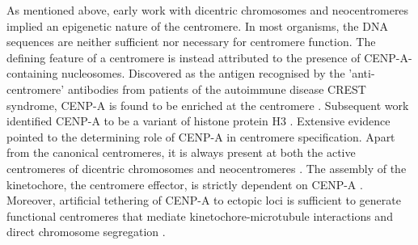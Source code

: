 As mentioned above, early work with dicentric chromosomes and neocentromeres implied an epigenetic nature of the centromere. In most organisms, the DNA sequences are neither sufficient nor necessary for centromere function. The defining feature of a centromere is instead attributed to the presence of CENP-A-containing nucleosomes. Discovered as the antigen recognised by the 'anti-centromere' antibodies from patients of the autoimmune disease CREST syndrome, CENP-A is found to be enriched at the centromere \citep{Earnshaw1985IdentificationScleroderma}. Subsequent work identified CENP-A to be a variant of histone protein H3 \citep{Palmer1987AHistones, Palmer1990TheNuclei, Palmer1991PurificationHistone., Palmer1985KinetochoreMononucleosomes, Sullivan1994HumanCentromere., Buchwitz1999AElegans, Henikoff2014TheVivo, Takahashi2000RequirementYeast}. Extensive evidence pointed to the determining role of CENP-A in centromere specification. Apart from the canonical centromeres, it is always present at both the active centromeres of dicentric chromosomes \citep{Earnshaw1985ThreeChromosome} and neocentromeres \citep{Marshall2008Neocentromeres:Evolution}. The assembly of the kinetochore, the centromere effector, is strictly dependent on CENP-A \citep{Fachinetti2013, Liu2006MappingCells, Regnier2005CENP-ABubR1}. Moreover, artificial tethering of CENP-A to ectopic loci is sufficient to generate functional centromeres that mediate kinetochore-microtubule interactions and direct chromosome segregation \citep{Heun2006, Mendiburo2011, Barnhart2011, Logsdon2015, Logsdon2019, Roure2019}. 

